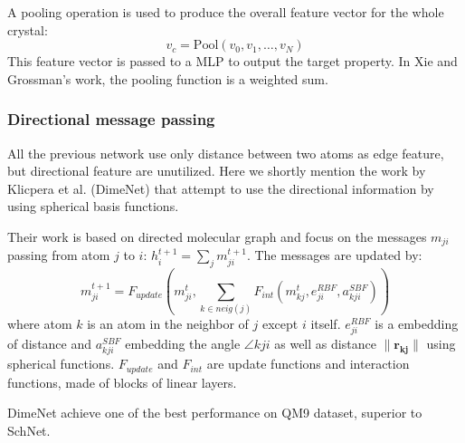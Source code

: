 \documentclass{article}
\begin{document}
A pooling operation is used to produce the overall feature vector for the whole crystal:
\begin{equation}
    v_c = \text{Pool}(v_0, v_1, \dots, v_N)
\end{equation}
This feature vector is passed to a MLP to output the target property. In Xie and Grossman's work,
the pooling function is a weighted sum. 

\subsubsection{Directional message passing}
All the previous network use only distance between two atoms as edge feature, 
but directional feature are unutilized. 
Here we shortly mention the work by Klicpera et al.\cite{directional_klicpera} (DimeNet) 
that attempt to use the directional information by using spherical basis functions. 

Their work is based on directed molecular graph and focus on the messages $m_{ji}$ passing from 
atom $j$ to $i$: $h_i^{t+1} = \sum_j m^{t+1}_{ji}$. The messages are updated by:
\begin{equation}
    m_{ji}^{t+1} 
    = F_{update}\left( m_{ji}^t, \sum_{k \in neig(j)} F_{int}(m_{kj}^{t}, e_{ji}^{RBF}, a^{SBF}_{kji}) \right)
\end{equation}
where atom $k$ is an atom in the neighbor of $j$ except $i$ itself. $e_{ji}^{RBF}$ is a 
embedding of distance and $a^{SBF}_{kji}$ embedding the angle $\angle kji$ as well as distance 
$\|\mathbf{r_{kj}}\|$ using spherical functions. 
$F_{update}$ and $F_{int}$ are update functions and interaction functions, made of blocks 
of linear layers.

DimeNet achieve one of the best performance on QM9 dataset, superior to SchNet.
\end{document}
